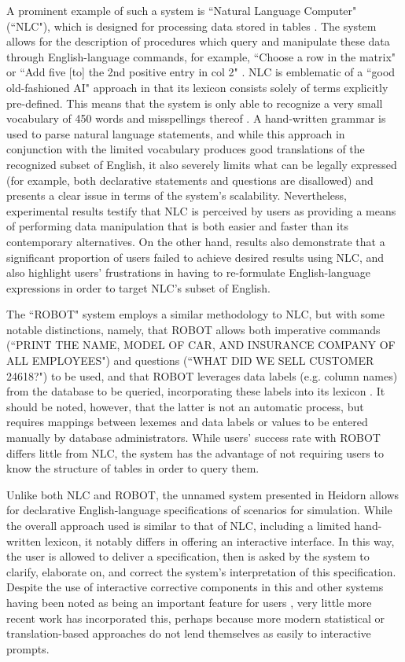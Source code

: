 \documentclass[a4paper,11pt]{proposal}
\begin{document}
A prominent example of such a system is ``Natural Language Computer" (``NLC"), which is designed for processing data stored in tables \cite{ballard1979} \cite{biermann1983}. The system allows for the description of procedures which query and manipulate these data through English-language commands, for example, ``Choose a row in the matrix" or ``Add five [to] the 2nd positive entry in col 2" \cite{ballard1979}. NLC is emblematic of a ``good old-fashioned AI" approach in that its lexicon consists solely of terms explicitly pre-defined. This means that the system is only able to recognize a very small vocabulary of 450 words and misspellings thereof \cite{ballard1979}. A hand-written grammar is used to parse natural language statements, and while this approach in conjunction with the limited vocabulary produces good translations of the recognized subset of English, it also severely limits what can be legally expressed (for example, both declarative statements and questions are disallowed) and presents a clear issue in terms of the system's scalability. Nevertheless, experimental results \cite{biermann1983} testify that NLC is perceived by users as providing a means of performing data manipulation that is both easier and faster than its contemporary alternatives. On the other hand, results also demonstrate that a significant proportion of users failed to achieve desired results using NLC, and also highlight users' frustrations in having to re-formulate English-language expressions in order to target NLC's subset of English.

The ``ROBOT" system employs a similar methodology to NLC, but with some notable distinctions, namely, that ROBOT allows both imperative commands (``PRINT THE NAME, MODEL OF CAR, AND INSURANCE COMPANY OF ALL EMPLOYEES") and questions (``WHAT DID WE SELL CUSTOMER 24618?") to be used, and that ROBOT leverages data labels (e.g. column names) from the database to be queried, incorporating these labels into its lexicon \cite{harris1977}. It should be noted, however, that the latter is not an automatic process, but requires mappings between lexemes and data labels or values to be entered manually by database administrators. While users' success rate with ROBOT differs little from NLC, the system has the advantage of not requiring users to know the structure of tables in order to query them.

Unlike both NLC and ROBOT, the unnamed system presented in Heidorn \cite{heidorn1974} allows for declarative English-language specifications of scenarios for simulation. While the overall approach used is similar to that of NLC, including a limited hand-written lexicon, it notably differs in offering an interactive interface. In this way, the user is allowed to deliver a specification, then is asked by the system to clarify, elaborate on, and correct the system's interpretation of this specification. Despite the use of interactive corrective components in this and other systems having been noted as being an important feature for users \cite{capindale1990}, very little more recent work has incorporated this,  perhaps because more modern statistical or translation-based approaches do not lend themselves as easily to interactive prompts.
\end{document}
